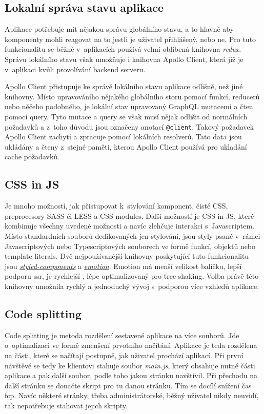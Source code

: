 \subsection{Lokalní správa stavu aplikace}
\label{ss:local_state_management}
Aplikace potřebuje mít nějakou správu globálního stavu, a to hlavně aby komponenty mohli reagovat na to jestli je uživatel přihlášený, nebo ne. Pro tuto funkcionalitu se běžně v~aplikacích používá velmi oblíbená knihovna \emph{redux}. Správu lokálního stavu však umožňuje i knihovna Apollo Client, která již je v~aplikaci kvůli provolívání backend serveru.

Apollo Client přistupuje ke správě lokálního stavu aplikace odlišně, než jiné knihovny. Místo upravováního nějakého globálního storu pomocí funkcí, reducerů nebo něčeho podobného, je lokální stav upravovaný GraphQL mutacemi a čten pomocí query. Tyto mutace a query se však musí nějak odlišit od normálních požadavků a z~toho důvodu jsou označeny anotací \texttt{@client}. Takový požadavek Apollo Client zachytí a zpracuje pomocí lokálních resolverů. Tato data jsou ukládány a čteny z~stejné paměti, kterou Apollo Client používá pro ukladání cache požadavků.

\subsection{CSS in JS}
\label{ss:css_in_js}
Je mnoho možností, jak přistupovat k~stylování komponent, čisté CSS, preprocesory SASS či LESS a CSS modules. Další možností je CSS in JS, které kombinuje všechny uvedené možnosti a navíc zlehčuje interakci s~Javascriptem. Místo standardních souborů dedikovaných jen stylování, jsou styly psané v~rámci Javascriptových nebo Typescriptových souborech ve formě funkcí, objektů nebo template literals. Dvě nejpoužívanější knihovny poskytující tuto funkcionalitu jsou \href{https://styled-components.com/}{\emph{styled-components}} a \href{https://emotion.sh/}{\emph{emotion}}. Emotion má menší velikost balíčku, lepší podporu \acrshort{ssr}, je rychlejší \cite{shehet_2020_css}, lépe optimalizovaný pro \gls{tree shaking}. Volba právě této knihovny umožnila rychlý a jednoduchý vývoj s~podporou více vzhledů aplikace.

\subsection{Code splitting}
\label{ss:code_splitting}
Code splitting je metoda rozdělení sestavené aplikace na více souborů. Jde o~optimalizaci ve formě zmenšení prvotního načítání. Aplikace je teda rozdělena na části, které se načítají postupně, jak uživatel prochází aplikací. Při první návštěvě se tedy ke klientovi stahuje soubor \emph{main.js}, který obsahuje nutné části aplikace a pak další soubor, podle toho jakou stránku navštívil. Při přechodu na další stránku se donačte skript pro tu danou stránku. Tím se docílí snížení čas \acrshort{fcp}. Navíc některé stránky, třeba administrátorské, běžný uživatel nikdy neuvidí, tak nepotřebuje stahovat jejich skripty.

